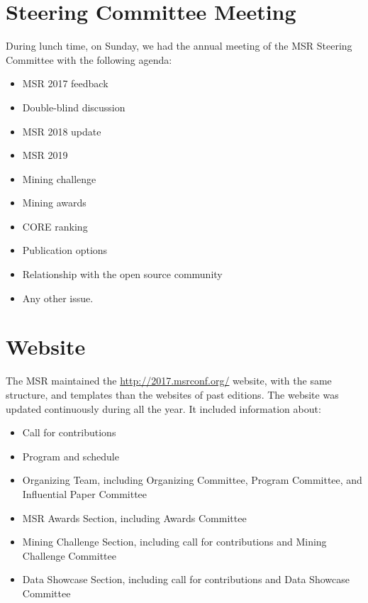 \documentclass[a4paper]{report}
\begin{document}
\section{Steering Committee Meeting}

During lunch time, on Sunday, we had the annual meeting of the MSR Steering Committee with the following agenda:

\begin{itemize}
\item MSR 2017 feedback
\item Double-blind discussion
\item MSR 2018 update
\item MSR 2019
\item Mining challenge
\item Mining awards
\item CORE ranking
\item Publication options
\item Relationship with the open source community
\item Any other issue.
\end{itemize}


\section{Website}

The MSR maintained the \url{http://2017.msrconf.org/} website, with the same structure, and templates than the websites of past editions. The website was updated continuously during all the year. It included information about:

\begin{itemize}
\item Call for contributions
\item Program and schedule
\item Organizing Team, including Organizing Committee, Program Committee, and Influential Paper Committee
\item MSR Awards Section, including Awards Committee
\item Mining Challenge Section, including call for contributions and Mining Challenge Committee
\item Data Showcase Section, including call for contributions and Data Showcase Committee
\end{itemize}
\end{document}
